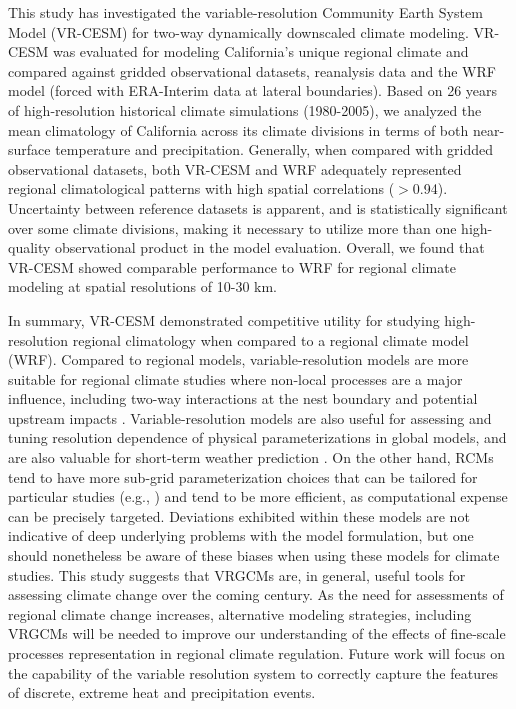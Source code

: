 This study has investigated the variable-resolution Community Earth System Model (VR-CESM) for two-way dynamically downscaled climate modeling. VR-CESM was evaluated for modeling California's unique regional climate and compared against gridded observational datasets, reanalysis data and the WRF model (forced with ERA-Interim data at lateral boundaries). Based on 26 years of high-resolution historical climate simulations (1980-2005), we analyzed the mean climatology of California across its climate divisions in terms of both near-surface temperature and precipitation. Generally, when compared with gridded observational datasets, both VR-CESM and WRF adequately represented regional climatological patterns with high spatial correlations ($>$0.94). Uncertainty between reference datasets is apparent, and is statistically significant over some climate divisions, making it necessary to utilize more than one high-quality observational product in the model evaluation. Overall, we found that VR-CESM showed comparable performance to WRF for regional climate modeling at spatial resolutions of 10-30 km.

In summary, VR-CESM demonstrated competitive utility for studying high-resolution regional climatology when compared to a regional climate model (WRF). Compared to regional models, variable-resolution models are more suitable for regional climate studies where non-local processes are a major influence, including two-way interactions at the nest boundary and potential upstream impacts \cite{sakaguchi2015exploring}.  Variable-resolution models are also useful for assessing and tuning resolution dependence of physical parameterizations in global models, and are also valuable for short-term weather prediction \cite{zarzycki2015experimental}. On the other hand, RCMs tend to have more sub-grid parameterization choices that can be tailored for particular studies (e.g., \cite{cassano2011performance}) and tend to be more efficient, as computational expense can be precisely targeted. Deviations exhibited within these models are not indicative of deep underlying problems with the model formulation, but one should nonetheless be aware of these biases when using these models for climate studies. This study suggests that VRGCMs are, in general, useful tools for assessing climate change over the coming century. As the need for assessments of regional climate change increases, alternative modeling strategies, including VRGCMs will be needed to improve our understanding of the effects of fine-scale processes representation in regional climate regulation. Future work will focus on the capability of the variable resolution system to correctly capture the features of discrete, extreme heat and precipitation events.

